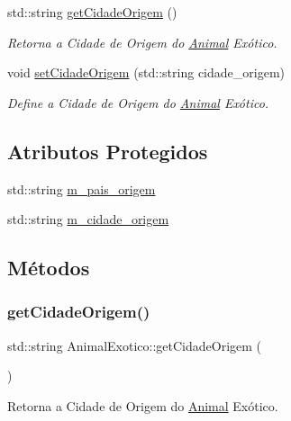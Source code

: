 \begin{DoxyCompactItemize}
std\+::string \hyperlink{classAnimalExotico_a3b9a4a0366f253bf06befa65754d38a3}{get\+Cidade\+Origem} ()
\begin{DoxyCompactList}\small\item\em Retorna a Cidade de Origem do \hyperlink{classAnimal}{Animal} Exótico. \end{DoxyCompactList}\item 
void \hyperlink{classAnimalExotico_abee9fb2e0bfd567a8a0fcb302cf944db}{set\+Cidade\+Origem} (std\+::string cidade\+\_\+origem)
\begin{DoxyCompactList}\small\item\em Define a Cidade de Origem do \hyperlink{classAnimal}{Animal} Exótico. \end{DoxyCompactList}\end{DoxyCompactItemize}
\subsection*{Atributos Protegidos}
\begin{DoxyCompactItemize}
\item 
std\+::string \hyperlink{classAnimalExotico_a5a00f07c9cd9f11baadef0282eaad031}{m\+\_\+pais\+\_\+origem}
\item 
std\+::string \hyperlink{classAnimalExotico_a99e6ec9acb3106efc101a828f645c1dc}{m\+\_\+cidade\+\_\+origem}
\end{DoxyCompactItemize}


\subsection{Métodos}
\mbox{\label{classAnimalExotico_a3b9a4a0366f253bf06befa65754d38a3}} 
\subsubsection{\texorpdfstring{get\+Cidade\+Origem()}{getCidadeOrigem()}}
{\footnotesize\ttfamily std\+::string Animal\+Exotico\+::get\+Cidade\+Origem (\begin{DoxyParamCaption}{ }\end{DoxyParamCaption})}



Retorna a Cidade de Origem do \hyperlink{classAnimal}{Animal} Exótico. 

